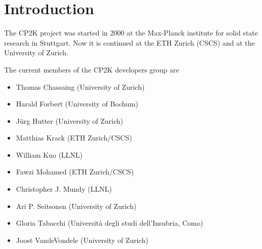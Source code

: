 \documentclass[12pt,twoside,a4paper]{article}
\newcommand{\bi}{\begin{itemize}}
\newcommand{\ei}{\end{itemize}}
\begin{document}
\section*{\contentsname}
\hypertarget{\contentsname}{}
\pdfbookmark[1]{\contentsname}{\contentsname}
\newpage\null\newpage
%
\section{Introduction}
%
The CP2K project was started in 2000 at the Max-Planck institute for
solid state research in Stuttgart. Now it is continued at the
ETH Zurich (CSCS) and at the University of Zurich.

The current members of the CP2K developers group are
\bi
 \item Thomas Chassaing (University of Zurich)
 \item Harald Forbert (University of Bochum)
 \item J\"urg Hutter (University of Zurich)
 \item Matthias Krack (ETH Zurich/CSCS)
 \item William Kuo (LLNL)
 \item Fawzi Mohamed (ETH Zurich/CSCS)
 \item Christopher J. Mundy (LLNL)
 \item Ari P. Seitsonen (University of Zurich)
 \item Gloria Tabacchi (Universit\`a degli studi dell'Insubria, Como)
 \item Joost VandeVondele (University of Zurich)
\ei
\newpage
%
\end{document}
